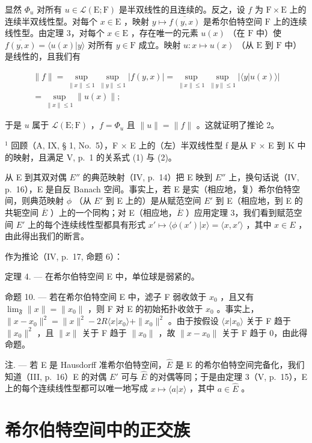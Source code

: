 显然 \(\Phi_u\) 对所有 \(u \in \mathcal{L}(\mathrm{E};\mathrm{F})\) 是半双线性的且连续的。反之，设 \(f\) 为 \(\mathrm{F} \times \mathrm{E}\) 上的连续半双线性型。对每个 \(x \in \mathrm{E}\) ，映射 \(y \mapsto \overline{f(y,x)}\) 是希尔伯特空间 \(\mathrm{F}\) 上的连续线性型。由定理 3，对每个 \(x \in \mathrm{E}\) ，存在唯一的元素 \(u(x)\) （在 \(\mathrm{F}\) 中）使 \(\overline{f(y,x)} = \langle u(x)|y\rangle\) 对所有 \(y \in \mathrm{F}\) 成立。映射 \(u: x \mapsto u(x)\) （从 \(\mathrm{E}\) 到 \(\mathrm{F}\) 中）是线性的，且我们有

\[
\begin{array}{l} \| f \| = \sup _ {\| x \| \leqslant 1} \sup _ {\| y \| \leqslant 1} | f (y, x) | = \sup _ {\| x \| \leqslant 1} \sup _ {\| y \| \leqslant 1} | \langle y | u (x) \rangle | \\ = \sup _ {\| x \| \leqslant 1} \| u (x) \|; \end{array}
\]

于是 \(u\) 属于 \(\mathcal{L}(\mathrm{E};\mathrm{F})\) ，\(f = \Phi_u\) 且 \(\| u\| = \| f\|\) 。这就证明了推论 2。

\(^{1}\) 回顾（A, IX, § 1, No.~5），F × E 上的（左）半双线性型 f 是从 F × E 到 K 中的映射，且满足 V, p.~1 的关系式 (1) 与 (2)。

从 E 到其双对偶 \(E''\) 的典范映射（IV, p.~14）把 E 映到 \(E''\) 上，换句话说（IV, p.~16），E 是自反 Banach 空间。事实上，若 E 是实（相应地，复）希尔伯特空间，则典范映射 \(\phi\) （从 \(E'\) 到 E 上的）是从赋范空间 \(E'\) 到 E（相应地，到 E 的共轭空间 \(\overline{E}\) ）上的一个同构；对 E（相应地，\(\overline{E}\) ）应用定理 3，我们看到赋范空间 \(E'\) 上的每个连续线性型都具有形式 \(x' \mapsto \langle \phi(x') | x \rangle = \langle x, x' \rangle\) ，其中 \(x \in E\) ，由此得出我们的断言。

作为推论（IV, p.~17, 命题 6）：

定理 4. --- 在希尔伯特空间 E 中，单位球是弱紧的。

命题 10. --- 若在希尔伯特空间 E 中，滤子 F 弱收敛于 \(x_{0}\) ，且又有 \(\lim_{\mathfrak{F}} \|x\| = \|x_{0}\|\) ，则 F 对 E 的初始拓扑收敛于 \(x_{0}\) 。事实上，\(\|x - x_{0}\|^{2} = \|x\|^{2} - 2R \langle x|x_{0} \rangle + \|x_{0}\|^{2}\) 。由于按假设 \(\langle x|x_{0}\rangle\) 关于 F 趋于 \(\|x_{0}\|^{2}\) ，且 \(\|x\|\) 关于 F 趋于 \(\|x_{0}\|\) ，故 \(\|x - x_{0}\|\) 关于 F 趋于 0，由此得命题。

注. --- 若 E 是 Hausdorff 准希尔伯特空间，\(\hat{E}\) 是 E 的希尔伯特空间完备化，我们知道（III, p.~16）E 的对偶 \(E'\) 可与 \(\hat{E}\) 的对偶等同；于是由定理 3（V, p.~15），E 上的每个连续线性型都可以唯一地写成 \(x \mapsto \langle a|x\rangle\) ，其中 \(a \in \hat{E}\) 。

\section{希尔伯特空间中的正交族}
